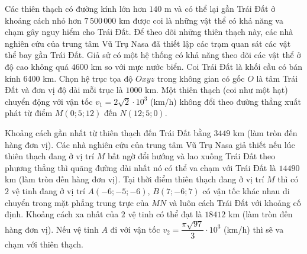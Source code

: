\begin{ex}
Các thiên thạch có đường kính lớn hơn $140$ m và có thể lại gần Trái Đất ở khoảng cách nhỏ hơn $7\,500\,000$ km được coi là những vật thể có khả năng va chạm gây nguy hiểm cho Trái Đất. Để theo dõi những thiên thạch này, các nhà nghiên cứu của trung tâm Vũ Trụ Nasa đã thiết lập các trạm quan sát các vật thể bay gần Trái Đất. Giả sử có một hệ thống có khả năng theo dõi các vật thể ở độ cao không quá $4600$ km so với mực nước biển. Coi Trái Đất là khối cầu có bán kính $6400$ km. Chọn hệ trục tọa độ $Oxyz$ trong không gian có gốc $O$ là tâm Trái Đất và đơn vị độ dài mỗi trục là $1000$ km. Một thiên thạch (coi như một hạt) chuyển động với vận tốc $v_1=2\sqrt2\cdot10^3$ (km/h) không đổi theo đường thẳng xuất phát từ điểm $M(0;5;12)$ đến $N(12;5;0)$.
\begin{center}
\end{center}
\choiceTF
{\True Khoảng cách gần nhất từ thiên thạch đến Trái Đất bằng $3449$ km (làm tròn đến hàng đơn vị).}
{Các nhà nghiên cứu của trung tâm Vũ Trụ Nasa giả thiết nếu lúc thiên thạch đang ở vị trí $M$ bất ngờ đổi hướng và lao xuống Trái Đất theo phương thẳng thì quãng đường dài nhất nó có thể va chạm với Trái Đất là $14490$ km (làm tròn đến hàng đơn vị).}
{Tại thời điểm thiên thạch đang ở vị trí $M$ thì có $2$ vệ tinh đang ở vị trí $A(-6;-5;-6)$, $B(7;-6;7)$ có vận tốc khác nhau di chuyển trong mặt phẳng trung trực của $MN$ và luôn cách Trái Đất với khoảng cố định. Khoảng cách xa nhất của $2$ vệ tinh có thể đạt là $18412$ km (làm tròn đến hàng đơn vị).}
{\True Nếu vệ tinh $A$ đi với vận tốc $v_2=\dfrac{\pi\sqrt{97}}3\cdot10^3$ (km/h) thì sẽ va chạm với thiên thạch.}
\end{ex}
